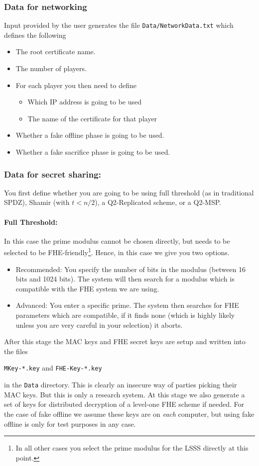 \subsubsection{Data for networking}
Input provided by the user generates the file
\verb+Data/NetworkData.txt+ which defines the following
\begin{itemize}
\item The root certificate name.
\item The number of players.
\item For each player you then need to define
\begin{itemize}
  \item Which IP address is going to be used
  \item The name of the certificate for that player
\end{itemize}
\item Whether a fake offline phase is going to be used.
\item Whether a fake sacrifice phase is going to be used.
\end{itemize}

\subsubsection{Data for secret sharing:}
You first define whether you are going to be using full threshold (as in
traditional SPDZ), Shamir (with $t<n/2$), a Q2-Replicated scheme, or 
a Q2-MSP.

\paragraph{Full Threshold:}
In this case the prime modulus cannot be chosen directly, but
needs to be selected to be FHE-friendly\footnote{In all other cases you select the prime modulus for the LSSS directly at this point.}.
Hence, in this case we give you two options.
\begin{itemize}
\item Recommended: You specify the number of bits in the modulus
(between 16 bits and 1024 bits).  The system will then
search for a modulus which is compatible with the FHE system we are
using.
\item Advanced: You enter a specific prime. The system then searches
for FHE parameters which are compatible, if it finds none (which is highly
likely unless you are very careful in your selection) it aborts.
\end{itemize}
After this stage the MAC keys and FHE secret keys are setup and written into the
files 
\begin{center}
\verb+MKey-*.key+ and \verb+FHE-Key-*.key+ 
\end{center}
in the \verb+Data+ directory. 
This is clearly an insecure way of parties picking their MAC keys. But this is only a
research system. 
At this stage we also generate a set of keys
for distributed decryption of a level-one FHE scheme if needed.
For the case of fake offline we assume these keys are on {\em each} computer,
but using fake offline is only for test purposes in any case.

